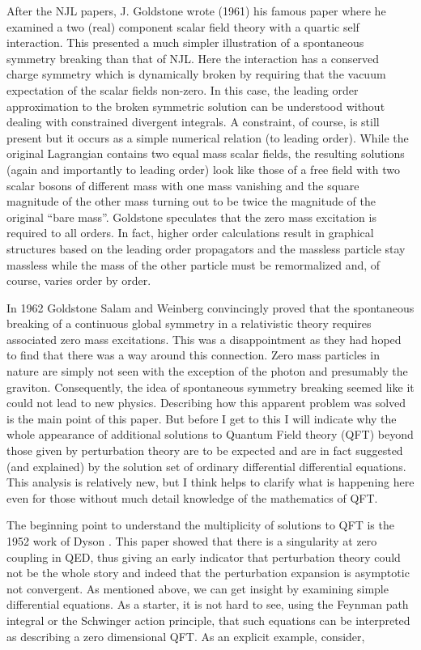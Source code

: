 \documentclass[preprintnumbers,12pt]{revtex4-2}
\begin{document}
After the NJL papers, J. Goldstone wrote (1961) \cite{jg;1961} his
famous paper where he examined a two (real) component scalar field
theory with a quartic self interaction. This presented a much simpler
illustration of a spontaneous symmetry breaking than that of NJL.
Here the interaction has a conserved charge symmetry which is
dynamically broken by requiring that the vacuum expectation of the
scalar fields non-zero. In this case, the leading
order approximation to the broken symmetric solution can be understood
without dealing with constrained divergent integrals. A constraint, of
course, is still present but it occurs as a simple numerical relation
(to leading order). While the original Lagrangian contains two equal
mass scalar fields, the resulting solutions (again and importantly to
leading order) look like those of a free field with two scalar bosons
of different mass with one mass vanishing and the square magnitude of
the other mass turning out to be twice the magnitude of the original
``bare mass''. Goldstone speculates that the zero mass excitation is required to all orders.
In fact,  higher order calculations result in graphical
structures based on the leading order propagators and the massless
particle stay massless while the mass of the other particle must be
remormalized and, of course, varies order by order.

In 1962 Goldstone Salam and Weinberg \cite{gsw;1962} convincingly proved that the
spontaneous breaking of a continuous global symmetry in a relativistic
theory requires associated zero mass excitations. This was a disappointment as they had hoped to
find that there was a way around this connection. Zero mass particles in nature are simply not seen with the
exception of the photon and presumably the graviton. Consequently, the idea of spontaneous symmetry breaking
seemed like it could not lead to new physics. Describing how this apparent problem was solved is the main point of
this paper. But before I get to this I will indicate why the whole
appearance of additional solutions to Quantum Field theory (QFT) beyond those
given by perturbation theory are to be expected and are in fact
suggested (and explained) by the solution set of ordinary differential differential equations. This
analysis is relatively new, but I think helps to clarify what is happening here even for those without
much detail knowledge of the mathematics of QFT.

The beginning point to understand the multiplicity of solutions to QFT
is the 1952 work of Dyson \cite{dyson;1952}. This paper showed that
there is a singularity at zero coupling in QED, thus giving an early
indicator that perturbation theory could not be the whole story and
indeed that the perturbation expansion is asymptotic not
convergent. As mentioned above, we can get insight by examining simple
differential equations. As a starter, it is not hard to see, using the Feynman path
integral or the Schwinger action principle, that such equations can be
interpreted as describing a zero dimensional QFT. As an explicit example, consider,
\end{document}
